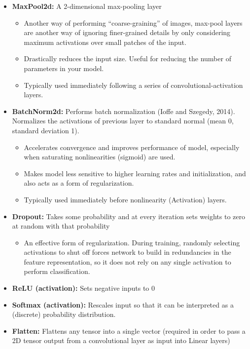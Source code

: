 \begin{itemize}
\begin{itemize}
    \end{itemize}
    \item \textbf{MaxPool2d:} A 2-dimensional max-pooling layer
    \begin{itemize}
        \item Another way of performing ``coarse-graining'' of images, max-pool layers are another way of ignoring finer-grained details by only considering maximum activations over small patches of the input.
        \item Drastically reduces the input size. Useful for reducing the number of parameters in your model.
        \item Typically used immediately following a series of convolutional-activation layers.
    \end{itemize}
    \item \textbf{BatchNorm2d:} Performs batch normalization (Ioffe and Szegedy, 2014). Normalizes the activations of previous layer to standard normal (mean 0, standard deviation 1).
    \begin{itemize}
        \item Accelerates convergence and improves performance of model, especially when saturating nonlinearities (sigmoid) are used.
        \item Makes model less sensitive to higher learning rates and initialization, and also acts as a form of regularization.
        \item Typically used immediately before nonlinearity (Activation) layers.
    \end{itemize}
    \item \textbf{Dropout:} Takes some probability and at every iteration sets weights to zero at random with that probability
    \begin{itemize}
        \item An effective form of regularization. During training, randomly selecting activations to shut off forces network to build in redundancies in the feature representation, so it does not rely on any single activation to perform classification.
    \end{itemize}
    \item \textbf{ReLU (activation):} Sets negative inputs to 0
    \item \textbf{Softmax (activation):} Rescales input so that it can be interpreted as a (discrete) probability distribution.
    \item \textbf{Flatten:} Flattens any tensor into a single vector (required in order to pass a 2D tensor output from a convolutional layer as input into Linear layers)
\end{itemize}

